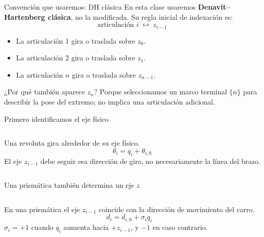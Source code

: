 \documentclass[aspectratio=169,11pt]{beamer}
\begin{document}
\begin{frame}[t]{Convención que usaremos: DH clásica}
 \small
 En esta clase usaremos \textbf{Denavit--Hartenberg clásica}, no la modificada.
 Su regla inicial de indexación es:
 \[
 \boxed{\text{articulación }i\ \longleftrightarrow\ z_{i-1}}
 \]
 \pause
 \begin{itemize}
  \item La articulación 1 gira o traslada sobre $z_0$.
  \item La articulación 2 gira o traslada sobre $z_1$.
  \item La articulación $n$ gira o traslada sobre $z_{n-1}$.
 \end{itemize}
 \pause
 \begin{block}{¿Por qué también aparece $z_n$?}
 Porque seleccionamos un marco terminal $\{n\}$ para describir
 la pose del extremo; no implica una articulación adicional.
 \end{block}
\end{frame}

\begin{frame}[t]{Primero identificamos el eje físico}
 \begin{columns}[T,onlytextwidth]
 \centering
 \small Una revoluta gira alrededor de su eje físico.
 \pause
 \[
 \boxed{\theta_i=q_i+\theta_{i,0}}
 \]
 \small El eje $z_{i-1}$ debe seguir esa dirección de giro,
 no necesariamente la línea del brazo.
 \end{columns}
\end{frame}

\begin{frame}[t]{Una prismática también determina un eje $z$}
 \begin{columns}[T,onlytextwidth]
 \centering
 \small En una prismática el eje $z_{i-1}$ coincide con
 la dirección de movimiento del carro.
 \pause
 \[
 \boxed{d_i=d_{i,0}+\sigma_iq_i}
 \]
 \small $\sigma_i=+1$ cuando $q_i$ aumenta hacia $+z_{i-1}$,
 y $-1$ en caso contrario.
 \end{columns}
\end{frame}
\end{document}
